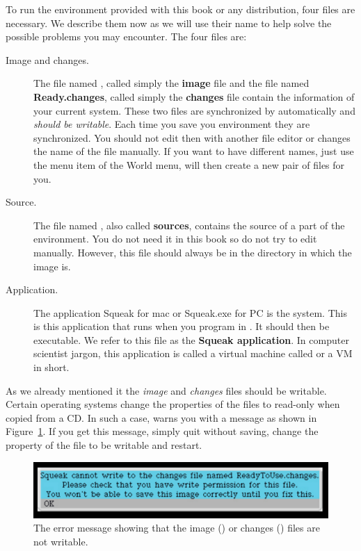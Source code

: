 To run the environment provided with this book or any  \sq distribution, four files are necessary. We describe them now as we will use their name to help solve the possible problems you may encounter.  The four files are: 
\begin{description} 
\item[Image and changes.] The file named , called simply the \textbf{image} file and the file named \textbf{Ready.changes}, called simply the \textbf{changes}  file contain the information of your current system. These two files are synchronized by \sq automatically and \emph{should be writable}. Each time you save you environment they are synchronized. You should not edit then with another file editor or changes the name of the file manually. If you want to have different names, just use the 
menu item of the World menu, \sq will then create a new pair of files for you. 

 
\item[Source.] The file named , also called \textbf{sources}, contains the source of a part of the \sq environment. You do not need it in this book so do not try to edit manually. However, this file should always be in the directory in which the image is.
  
\item[Application.] The application Squeak for mac or Squeak.exe for PC is the \sq system. This is this application that runs when you program in \sq. It should then be executable. We refer to this file as the \textbf{Squeak application}. In computer scientist jargon, this application is called a  virtual machine called or  a VM  in short. 
\end{description}

As we already mentioned it the \textit{image} and \textit{changes} files should be writable. Certain operating systems change the properties of the files to read-only when copied from a CD. In such a case, \sq warns you with a message as shown in Figure~\ref{fig:readonlyfile}. If you get this message, simply quit \sq without saving, change the property of the file to be writable and restart.  

\begin{figure}[!h]\centerline{\includegraphics[width=\linewidth]{changesNotWritable}}\caption{The error message showing that
 the image () or changes () files are not writable.\label{fig:readonlyfile}}
\end{figure}

